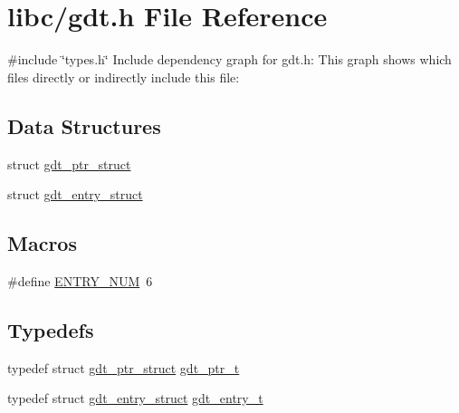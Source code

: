 \hypertarget{a00104}{}\section{libc/gdt.h File Reference}
\label{a00104}
{\ttfamily \#include \char`\"{}types.\+h\char`\"{}}\newline
Include dependency graph for gdt.\+h\+:
This graph shows which files directly or indirectly include this file\+:
\subsection*{Data Structures}
\begin{DoxyCompactItemize}
\item 
struct \hyperlink{a00232}{gdt\+\_\+ptr\+\_\+struct}
\item 
struct \hyperlink{a00236}{gdt\+\_\+entry\+\_\+struct}
\end{DoxyCompactItemize}
\subsection*{Macros}
\begin{DoxyCompactItemize}
\item 
\#define \hyperlink{a00104_abe29d44fbb5292a15af80cbb8e8a3a7d_abe29d44fbb5292a15af80cbb8e8a3a7d}{E\+N\+T\+R\+Y\+\_\+\+N\+UM}~6
\end{DoxyCompactItemize}
\subsection*{Typedefs}
\begin{DoxyCompactItemize}
\item 
typedef struct \hyperlink{a00232}{gdt\+\_\+ptr\+\_\+struct} \hyperlink{a00104_a3bf3fa6f397bda8399e1afb6283b66ca_a3bf3fa6f397bda8399e1afb6283b66ca}{gdt\+\_\+ptr\+\_\+t}
\item 
typedef struct \hyperlink{a00236}{gdt\+\_\+entry\+\_\+struct} \hyperlink{a00104_ab0b5c60e06a63669c783705278ff641e_ab0b5c60e06a63669c783705278ff641e}{gdt\+\_\+entry\+\_\+t}
\end{DoxyCompactItemize}
